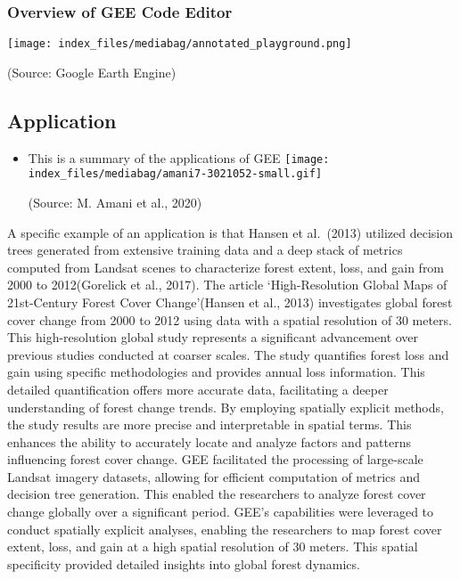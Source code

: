 \documentclass[
  letterpaper,
  DIV=11,
  numbers=noendperiod]{scrreprt}
\providecommand{\tightlist}{%
  \setlength{\itemsep}{0pt}\setlength{\parskip}{0pt}}\usepackage{longtable,booktabs,array}
\begin{document}
\hypertarget{overview-of-gee-code-editor}{%
\subsubsection{Overview of GEE Code
Editor}\label{overview-of-gee-code-editor}}

\texttt{[image: index\_files/mediabag/annotated\_playground.png]}

(Source: Google Earth Engine)

\hypertarget{application-2}{%
\subsection{Application}\label{application-2}}

\begin{itemize}
\tightlist
\item
  This is a summary of the applications of GEE
  \texttt{[image: index\_files/mediabag/amani7-3021052-small.gif]}

  (Source: M. Amani et al., 2020)
\end{itemize}

A specific example of an application is that Hansen et al.~(2013)
utilized decision trees generated from extensive training data and a
deep stack of metrics computed from Landsat scenes to characterize
forest extent, loss, and gain from 2000 to 2012(Gorelick et al., 2017).
The article `High-Resolution Global Maps of 21st-Century Forest Cover
Change'(Hansen et al., 2013) investigates global forest cover change
from 2000 to 2012 using data with a spatial resolution of 30 meters.
This high-resolution global study represents a significant advancement
over previous studies conducted at coarser scales. The study quantifies
forest loss and gain using specific methodologies and provides annual
loss information. This detailed quantification offers more accurate
data, facilitating a deeper understanding of forest change trends. By
employing spatially explicit methods, the study results are more precise
and interpretable in spatial terms. This enhances the ability to
accurately locate and analyze factors and patterns influencing forest
cover change. GEE facilitated the processing of large-scale Landsat
imagery datasets, allowing for efficient computation of metrics and
decision tree generation. This enabled the researchers to analyze forest
cover change globally over a significant period. GEE's capabilities were
leveraged to conduct spatially explicit analyses, enabling the
researchers to map forest cover extent, loss, and gain at a high spatial
resolution of 30 meters. This spatial specificity provided detailed
insights into global forest dynamics.
\end{document}
